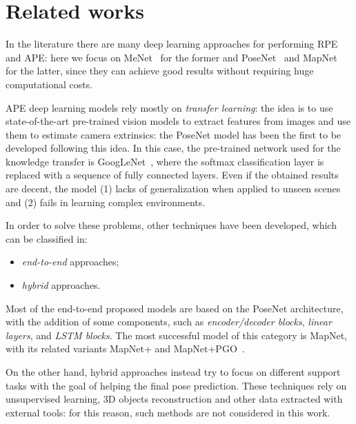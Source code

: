 \section{Related works}
In the literature there are many deep learning approaches for performing RPE and APE: here we focus on MeNet~\cite{menet} for the former and PoseNet~\cite{9348762} and MapNet~\cite{mapnet} for the latter, since they can achieve good results without requiring huge computational costs.

APE deep learning models rely mostly on \emph{transfer learning}: the idea is to use state-of-the-art pre-trained vision models to extract features from images and use them to estimate camera extrinsics: the PoseNet model has been the first to be developed following this idea. In this case, the pre-trained network used for the knowledge transfer is GoogLeNet~\cite{googlenet}, where the softmax classification layer is replaced with a sequence of fully connected layers. Even if the obtained results are decent, the model (1) lacks of generalization when applied to unseen scenes and (2) fails in learning complex environments.

In order to solve these problems, other techniques have been developed, which can be classified in:
\begin{itemize}
    \item \emph{end-to-end} approaches;
    \item \emph{hybrid} approaches.
\end{itemize}

Most of the end-to-end proposed models are based on the PoseNet architecture, with the addition of some components, such as \emph{encoder/decoder blocks}, \emph{linear layers}, and \emph{LSTM blocks}. The most successful model of this category is MapNet, with its related variants MapNet+ and MapNet+PGO~\cite{mapnet}.

On the other hand, hybrid approaches instead try to focus on different support tasks with the goal of helping the final pose prediction. These techniques rely on unsupervised learning, 3D objects reconstruction and other data extracted with external tools: for this reason, such methods are not considered in this work.
